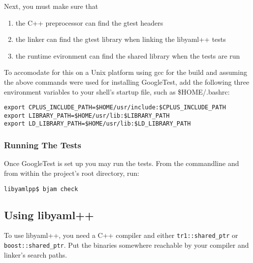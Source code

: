 \documentclass{article}
\begin{document}
Next, you must make sure that

\begin{enumerate}
\item the C++ preprocessor can find the gtest headers
\item the linker can find the gtest library when linking the libyaml++ tests
\item the runtime evironment can find the shared library when the tests are run
\end{enumerate}

To accomodate for this on a Unix platform using gcc for the build and assuming
the above commands were used for installing GoogleTest, add the following three
environment variables to your shell's startup file, such as \$HOME/.bashrc:

\begin{verbatim}
export CPLUS_INCLUDE_PATH=$HOME/usr/include:$CPLUS_INCLUDE_PATH
export LIBRARY_PATH=$HOME/usr/lib:$LIBRARY_PATH
export LD_LIBRARY_PATH=$HOME/usr/lib:$LD_LIBRARY_PATH
\end{verbatim}

\subsubsection{Running The Tests}

Once GoogleTest is set up you may run the tests.  From the commandline and from
within the project's root directory, run:

\begin{verbatim}
libyamlpp$ bjam check
\end{verbatim}

\subsection{Using libyaml++}
\label{using_libyamlpp}

To use libyaml++, you need a C++ compiler and either \texttt{tr1::shared\_ptr} or \texttt{boost::shared\_ptr}.  Put the binaries somewhere 
reachable by your compiler and linker's search paths.
\end{document}

